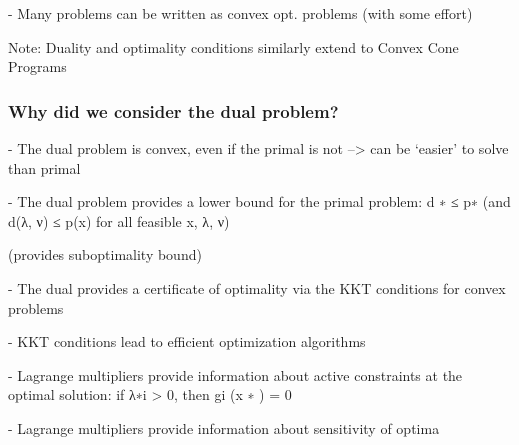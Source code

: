 - Many problems can be written as convex opt. problems (with some effort)

Note: Duality and optimality conditions similarly
extend to Convex Cone Programs

\subsubsection{Why did we consider the dual problem?}

- The dual problem is convex, even if the primal is not
–> can be ‘easier’ to solve than primal

- The dual problem provides a
lower bound for the primal problem: d ∗ ≤ p∗
(and d(λ, ν) ≤ p(x) for all feasible x, λ, ν)

(provides suboptimality bound)

- The dual provides a certificate of optimality
via the KKT conditions for convex problems

- KKT conditions lead to efficient optimization algorithms

- Lagrange multipliers provide information about active constraints
at the optimal solution: if λ∗i > 0, then gi (x ∗ ) = 0

- Lagrange multipliers provide information about sensitivity of optima

